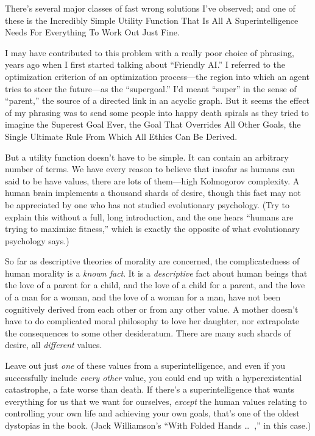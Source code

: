 {
 There's several major classes of fast wrong
solutions I've observed; and one of these is the
Incredibly Simple Utility Function That Is All A Superintelligence
Needs For Everything To Work Out Just Fine.}

{
 I may have contributed to this problem with a really poor choice
of phrasing, years ago when I first started talking about
``Friendly AI.'' I referred to the
optimization criterion of an optimization process---the region into
which an agent tries to steer the future---as the
``supergoal.'' I'd
meant ``super'' in the sense of
``parent,'' the source of a directed
link in an acyclic graph. But it seems the effect of my phrasing was to
send some people into happy death spirals as they tried to imagine the
Superest Goal Ever, the Goal That Overrides All Other Goals, the Single
Ultimate Rule From Which All Ethics Can Be Derived.}

{
 But a utility function doesn't have to be simple.
It can contain an arbitrary number of terms. We have every reason to
believe that insofar as humans can said to be have values, there are
lots of them---high Kolmogorov complexity. A human brain implements a
thousand shards of desire, though this fact may not be appreciated by
one who has not studied evolutionary psychology. (Try to explain this
without a full, long introduction, and the one hears
``humans are trying to maximize
fitness,'' which is exactly the opposite of what
evolutionary psychology says.)}

{
 So far as descriptive theories of morality are concerned, the
complicatedness of human morality is a \textit{known fact}. It is a
\textit{descriptive} fact about human beings that the love of a parent
for a child, and the love of a child for a parent, and the love of a
man for a woman, and the love of a woman for a man, have not been
cognitively derived from each other or from any other value. A mother
doesn't have to do complicated moral philosophy to love
her daughter, nor extrapolate the consequences to some other
desideratum. There are many such shards of desire, all
\textit{different} values.}

{
 Leave out just \textit{one} of these values from a
superintelligence, and even if you successfully include \textit{every
other} value, you could end up with a hyperexistential catastrophe, a
fate worse than death. If there's a superintelligence
that wants everything for us that we want for ourselves,
\textit{except} the human values relating to controlling your own life
and achieving your own goals, that's one of the oldest
dystopias in the book. (Jack Williamson's
``With Folded Hands \ldots~,'' in
this case.)}

